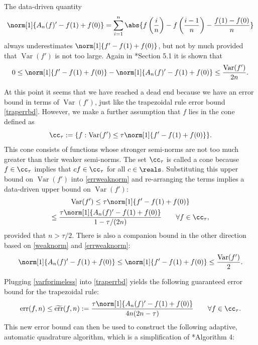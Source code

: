 \documentclass[]{article}
\DeclareMathOperator{\Var}{Var}
\DeclareMathOperator{\err}{err}
\newcommand{\terr}{\widetilde{\err}}
\theoremstyle{definition}
\theoremstyle{remark}
\begin{document}
The data-driven quantity 
\begin{equation} \label{weaknormalgo}
\norm[1]{A_n(f)'-f(1)+f(0)}= \sum_{i=1}^n \abs{f\left(\frac in \right)-f\left(\frac{i-1}n \right) - \frac{f(1)-f(0)}{n}}
\end{equation}
always underestimates $\norm[1]{f'-f(1)+f(0)}$, but not by much provided that $\Var(f')$ is not too large. Again in *{Section 5.1} it is shown that 
\begin{equation} \label{errweaknorm}
0 \le \norm[1]{f'-f(1)+f(0)} - \norm[1]{A_n(f)'-f(1)+f(0)} \le \frac{\Var(f')}{2n}.
\end{equation}

At this point it seems that we have reached a dead end because we have an error bound in terms of $\Var(f')$, just like the trapezoidal rule error bound \eqref{traperrbd}.  However, we make a further assumption that $f$ lies in the cone defined as 
\begin{equation} \label{conedef}
\cc_{\tau} := \{f : \Var(f') \le \tau \norm[1]{f'-f(1)+f(0)} \}.
\end{equation}
This cone consists of functions whose stronger semi-norms are not too much greater than their weaker semi-norms.  The set $\cc_{\tau}$ is called a cone because $f \in \cc_{\tau}$ implies that $cf \in \cc_{\tau}$ for all $c \in \reals$.  Substituting this upper bound on $\Var(f')$ into \eqref{errweaknorm} and re-arranging the terms implies a data-driven upper bound on  $\Var(f')$:
\begin{multline} \label{varfprimeless}
\Var(f') \le \tau \norm[1]{f'-f(1)+f(0)}  \\
\le \frac{\tau \norm[1]{A_n(f)'-f(1)+f(0)}}{1-\tau/(2n)} \qquad \forall f \in \cc_{\tau},
\end{multline}
provided that $n>\tau/2$.  There is also a companion bound in the other direction based on \eqref{weaknorm} and \eqref{errweaknorm}:
\begin{equation} \label{varfprimegreat}
\norm[1]{A_n(f)'-f(1)+f(0)} \le \norm[1]{f'-f(1)+f(0)} \le \frac{\Var(f')}{2}.
\end{equation}

Plugging \eqref{varfprimeless} into \eqref{traperrbd} yields the following guaranteed error bound for the trapezoidal rule:
\begin{equation} \label{guarerr}
\err(f,n) \le \terr(f,n) := \frac{\tau \norm[1]{A_n(f)'-f(1)+f(0)}} {4n(2n-\tau)} \qquad \forall f \in \cc_{\tau}.
\end{equation}
This new error bound can then be used to construct the following adaptive, automatic quadrature algorithm, which is a simplification of *{Algorithm 4}:
\end{document}
